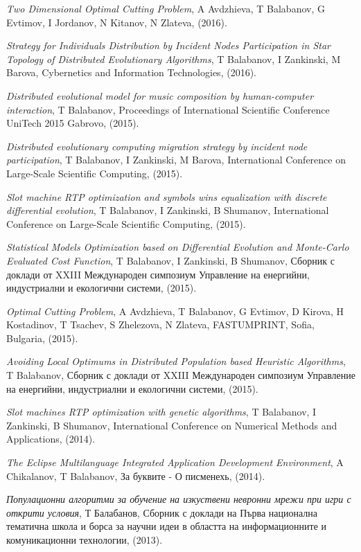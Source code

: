 \documentclass[bulgarian,a4paper]{europasscv}
\begin{document}
\begin{europasscv}
{\begin{ecvitemize}
    \item \textit{Two Dimensional Optimal Cutting Problem}, A Avdzhieva, T Balabanov, G Evtimov, I Jordanov, N Kitanov, N Zlateva, (2016).
    \item \textit{Strategy for Individuals Distribution by Incident Nodes Participation in Star Topology of Distributed Evolutionary Algorithms}, T Balabanov, I Zankinski, M Barova, Cybernetics and Information Technologies, (2016).
    \item \textit{Distributed evolutional model for music composition by human-computer interaction}, T Balabanov, Proceedings of International Scientific Conference UniTech 2015 Gabrovo, (2015).
    \item \textit{Distributed evolutionary computing migration strategy by incident node participation}, T Balabanov, I Zankinski, M Barova, International Conference on Large-Scale Scientific Computing, (2015).
    \item \textit{Slot machine RTP optimization and symbols wins equalization with discrete differential evolution}, T Balabanov, I Zankinski, B Shumanov, International Conference on Large-Scale Scientific Computing, (2015).
    \item \textit{Statistical Models Optimization based on Differential Evolution and Monte-Carlo Evaluated Cost Function}, T Balabanov, I Zankinski, B Shumanov, Сборник с доклади от XXIII Международен симпозиум Управление на енергийни, индустриални и екологични системи, (2015).
    \item \textit{Optimal Cutting Problem}, A Avdzhieva, T Balabanov, G Evtimov, D Kirova, H Kostadinov, T Tsachev, S Zhelezova, N Zlateva, FASTUMPRINT, Sofia, Bulgaria, (2015).
    \item \textit{Avoiding Local Optimums in Distributed Population based Heuristic Algorithms}, T Balabanov, Сборник с доклади от XXIII Международен симпозиум Управление на енергийни, индустриални и екологични системи, (2015).
    \item \textit{Slot machines RTP optimization with genetic algorithms}, T Balabanov, I Zankinski, B Shumanov, International Conference on Numerical Methods and Applications, (2014).
    \item \textit{The Eclipse Multilanguage Integrated Application Development Environment}, A Chikalanov, T Balabanov, За буквите - О писменехь, (2014).
    \item \textit{Популационни алгоритми за обучение на изкуствени невронни мрежи при игри с открити условия}, Т Балабанов, Сборник с доклади на Първа национална тематична школа и борса за научни идеи в областта на информационните и комуникационни технологии, (2013).

\end{ecvitemize}}
\end{europasscv}
\end{document}
